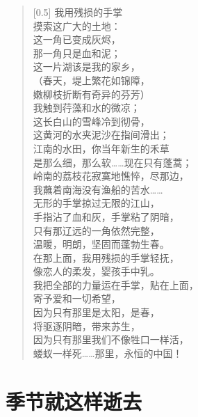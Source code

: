 \documentclass[12pt,UTF-8,openany]{ctexbook}
\begin{document}
\begin{large}
    
    \begin{verse}[0.5\linewidth]
        我用残损的手掌 \\
        摸索这广大的土地： \\
        这一角已变成灰烬， \\
        那一角只是血和泥； \\
        这一片湖该是我的家乡， \\
        （春天，堤上繁花如锦障， \\
        嫩柳枝折断有奇异的芬芳） \\
        我触到荇藻和水的微凉； \\
        这长白山的雪峰冷到彻骨， \\
        这黄河的水夹泥沙在指间滑出； \\
        江南的水田，你当年新生的禾草 \\
        是那么细，那么软……现在只有蓬蒿； \\
        岭南的荔枝花寂寞地憔悴，尽那边， \\
        我蘸着南海没有渔船的苦水…… \\
        无形的手掌掠过无限的江山， \\
        手指沾了血和灰，手掌粘了阴暗， \\
        只有那辽远的一角依然完整， \\
        温暖，明朗，坚固而蓬勃生春。 \\
        在那上面，我用残损的手掌轻抚， \\
        像恋人的柔发，婴孩手中乳。 \\
        我把全部的力量运在手掌，贴在上面， \\
        寄予爱和一切希望， \\
        因为只有那里是太阳，是春， \\
        将驱逐阴暗，带来苏生， \\
        因为只有那里我们不像牲口一样活， \\
        蝼蚁一样死……那里，永恒的中国！
    \end{verse}
    
\end{large}



\chapter{季节就这样逝去}
\end{document}
